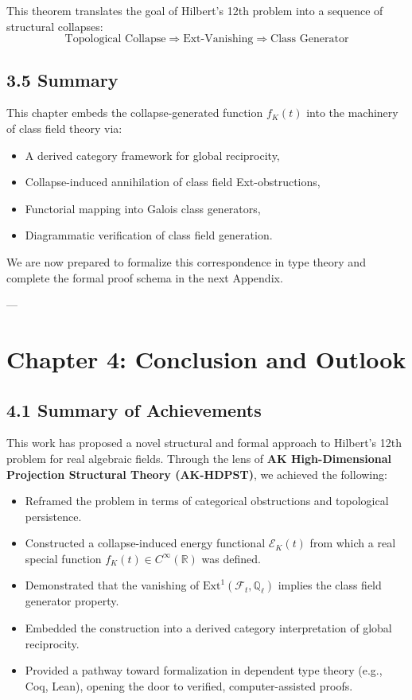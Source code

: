 \documentclass[11pt]{article}
\begin{document}
This theorem translates the goal of Hilbert’s 12th problem into a sequence of structural collapses:
\[
\text{Topological Collapse} \Rightarrow \text{Ext-Vanishing} \Rightarrow \text{Class Generator}
\]

\subsection*{3.5 Summary}

This chapter embeds the collapse-generated function \( f_K(t) \) into the machinery of class field theory via:
\begin{itemize}
    \item A derived category framework for global reciprocity,
    \item Collapse-induced annihilation of class field Ext-obstructions,
    \item Functorial mapping into Galois class generators,
    \item Diagrammatic verification of class field generation.
\end{itemize}

We are now prepared to formalize this correspondence in type theory and complete the formal proof schema in the next Appendix.


---


\section*{Chapter 4: Conclusion and Outlook}

\subsection*{4.1 Summary of Achievements}

This work has proposed a novel structural and formal approach to Hilbert’s 12th problem for real algebraic fields.  
Through the lens of \textbf{AK High-Dimensional Projection Structural Theory (AK-HDPST)}, we achieved the following:

\begin{itemize}
    \item Reframed the problem in terms of categorical obstructions and topological persistence.
    \item Constructed a collapse-induced energy functional \( \mathcal{E}_K(t) \) from which a real special function \( f_K(t) \in C^\infty(\mathbb{R}) \) was defined.
    \item Demonstrated that the vanishing of \( \mathrm{Ext}^1(\mathcal{F}_t, \mathbb{Q}_\ell) \) implies the class field generator property.
    \item Embedded the construction into a derived category interpretation of global reciprocity.
    \item Provided a pathway toward formalization in dependent type theory (e.g., Coq, Lean), opening the door to verified, computer-assisted proofs.
\end{itemize}
\end{document}
